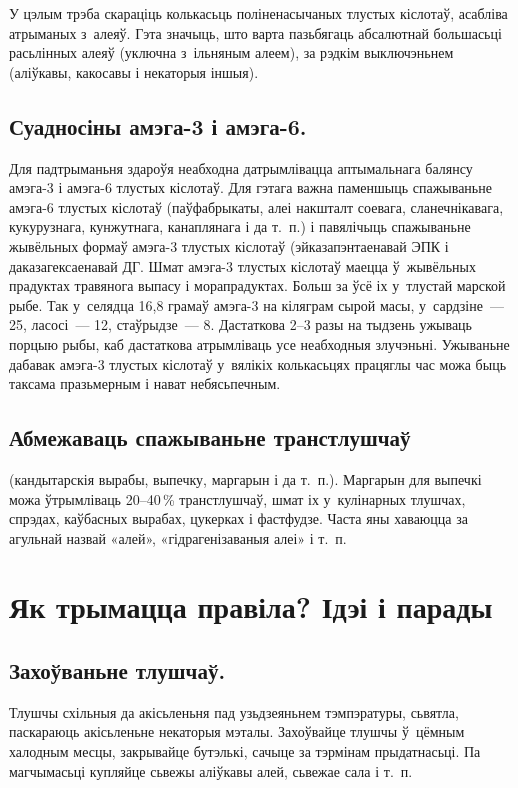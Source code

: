 У цэлым трэба скараціць колькасьць поліненасычаных тлустых кіслотаў, асабліва атрыманых з~алеяў. Гэта значыць, што варта пазьбягаць абсалютнай большасьці расьлінных алеяў (уключна з~ільняным алеем), за рэдкім выключэньнем (аліўкавы, какосавы і некаторыя іншыя).

\subsection{Суадносіны амэга-3 і амэга-6.}
Для падтрыманьня здароўя неабходна датрымлівацца аптымальнага балянсу амэга-3 і амэга-6 тлустых кіслотаў. Для гэтага важна паменшыць спажываньне амэга-6 тлустых кіслотаў (паўфабрыкаты, алеі накшталт соевага, сланечнікавага, кукурузнага, кунжутнага, канаплянага і да т.~п.) і павялічыць спажываньне жывёльных формаў амэга-3 тлустых кіслотаў (эйказапэнтаенавай ЭПК і даказагексаенавай ДГ. Шмат амэга-3 тлустых кіслотаў маецца ў~жывёльных прадуктах травянога выпасу і морапрадуктах. Больш за ўсё іх у~тлустай марской рыбе. Так у~селядца 16,8 грамаў амэга-3 на кіляграм сырой масы, у~сардзіне~--- 25, ласосі~--- 12, стаўрыдзе~--- 8. Дастаткова 2--3 разы на тыдзень ужываць порцыю рыбы, каб дастаткова атрымліваць усе неабходныя злучэньні. Ужываньне дабавак амэга-3 тлустых кіслотаў у~вялікіх колькасьцях працяглы час можа быць таксама празьмерным і нават небясьпечным.

\subsection{Абмежаваць спажываньне транстлушчаў} (кандытарскія вырабы, выпечку, маргарын і да т.~п.).
Маргарын для выпечкі можа ўтрымліваць 20--40\,\% транстлушчаў, шмат іх у~кулінарных тлушчах, спрэдах, каўбасных вырабах, цукерках і фастфудзе. Часта яны хаваюцца за агульнай назвай «алей», «гідрагенізаваныя алеі» і т.~п.

\section{Як трымацца правіла? Ідэі і парады}

\subsection{Захоўваньне тлушчаў.}
Тлушчы схільныя да акісьленьня пад узьдзеяньнем тэмпэратуры, сьвятла, паскараюць акісьленьне некаторыя мэталы. Захоўвайце тлушчы ў~цёмным халодным месцы, закрывайце бутэлькі, сачыце за тэрмінам прыдатнасьці. Па магчымасьці купляйце сьвежы аліўкавы алей, сьвежае сала і т.~п.

